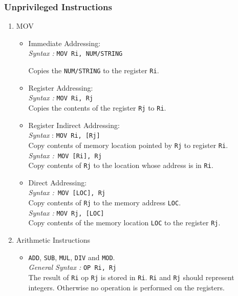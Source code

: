 \documentclass[11pt]{article}
\begin{document}
\subsubsection{Unprivileged Instructions}


\begin{enumerate}
\item MOV
\begin{itemize}
\item Immediate Addressing:\\
\textit{Syntax :} \texttt{MOV Ri, NUM/STRING}

Copies the \texttt{NUM/STRING} to the register \texttt{Ri}.

\item Register Addressing:\\
\textit{Syntax :} \texttt{MOV Ri, Rj}\\
Copies the contents of the register \texttt{Rj} to \texttt{Ri}.

\item Register Indirect Addressing:\\
\textit{Syntax }: \texttt{MOV Ri, [Rj]}\\
Copy contents of memory location pointed by \texttt{Rj} to register \texttt{Ri}.\\
\textit{Syntax :}\texttt{ MOV [Ri], Rj} \\
Copy contents of \texttt{Rj} to the location whose address is in \texttt{Ri}.
\item Direct Addressing:\\
\textit{Syntax :}\texttt{ MOV [LOC], Rj}\\
Copy contents of \texttt{Rj}  to the memory address \texttt{LOC}.\\
\textit{Syntax :} \texttt{MOV Rj, [LOC]}\\
Copy contents of the memory location \texttt{LOC} to the register \texttt{Rj}.
\end{itemize}


\item Arithmetic Instructions

\begin{itemize}
\item \texttt{ADD}, \texttt{SUB}, \texttt{MUL}, \texttt{DIV} and \texttt{MOD}.\\
\textit{General Syntax :} \texttt{OP Ri, Rj}\\
The result of \texttt{Ri} op \texttt{Rj} is stored in \texttt{Ri}. \texttt{Ri} and \texttt{Rj} should represent integers. Otherwise no operation is performed on the registers.


\end{itemize}
\end{enumerate}
\end{document}
